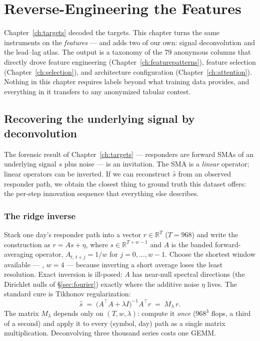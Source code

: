 \chapter{Reverse-Engineering the Features}
\label{ch:featforensics}

Chapter~\ref{ch:targets} decoded the targets. This chapter turns the same
instruments on the \emph{features} --- and adds two of our own: signal
deconvolution and the lead--lag atlas. The output is a taxonomy of the 79
anonymous columns that directly drove feature engineering
(Chapter~\ref{ch:featurepatterns}), feature selection
(Chapter~\ref{ch:selection}), and architecture configuration
(Chapter~\ref{ch:attention}). Nothing in this chapter requires labels beyond
what training data provides, and everything in it transfers to any anonymized
tabular contest.

\section{Recovering the underlying signal by deconvolution}
\label{sec:deconv}

The forensic result of Chapter~\ref{ch:targets} --- responders are forward
SMAs of an underlying signal $s$ plus noise --- is an invitation. The SMA is
a \emph{linear} operator; linear operators can be inverted. If we can
reconstruct $\hat s$ from an observed responder path, we obtain the closest
thing to ground truth this dataset offers: the per-step innovation sequence
that everything else describes.

\subsection{The ridge inverse}

Stack one day's responder path into a vector $r \in \mathbb R^{T}$
($T = 968$) and write the construction as $r = A s + \eta$, where
$s \in \mathbb R^{T + w - 1}$ and $A$ is the banded forward-averaging
operator, $A_{t,\,t+j} = 1/w$ for $j = 0,\dots,w-1$. Choose the shortest
window available --- , $w=4$ --- because inverting a short average
loses the least resolution. Exact inversion is ill-posed: $A$ has near-null
spectral directions (the Dirichlet nulls of \S\ref{sec:fourier}) exactly
where the additive noise $\eta$ lives. The standard cure is Tikhonov
regularization:
\begin{equation}
\hat s \;=\; \big(A^\top A + \lambda I\big)^{-1} A^\top r
\;=\; M_\lambda\, r .
\label{eq:ridgedeconv}
\end{equation}
The matrix $M_\lambda$ depends only on $(T, w, \lambda)$: compute it
\emph{once} ($968^3$ flops, a third of a second) and apply it to every
(symbol, day) path as a single matrix multiplication. Deconvolving three
thousand series costs one GEMM.

